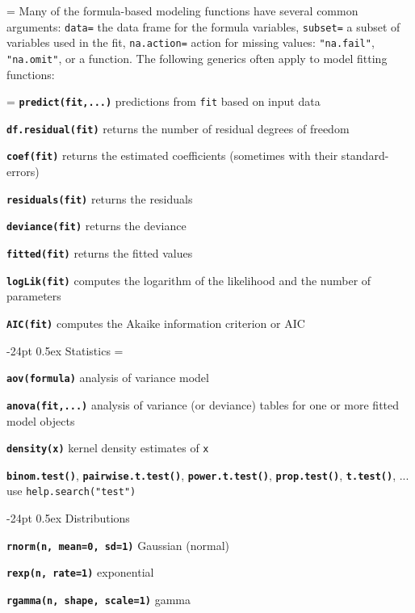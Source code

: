 \documentclass[8pt,landscape]{article}
\makeatletter
\renewcommand\section{\@startsection{section}{1}{0mm}%
                                     {-24pt}%
                                     {0.5ex}%
                                {\color{blue}\normalfont\large\bfseries}}
\newcommand{\code}{\texttt}
\newcommand{\bcode}[1]{\texttt{\textbf{#1}}}
\makeatother
\begin{document}
\begin{multicols*}{3}
\everypar={\hangindent=0mm}
Many of the formula-based modeling functions have several common
arguments: \code{data=} the data frame for the formula variables,
\code{subset=} a subset of variables used in the fit,
\code{na.action=} action for missing values: \code{"na.fail"}, \code{"na.omit"}, or
a function. The following generics often apply to model fitting functions: 

\everypar={\hangindent=9mm}
\bcode{predict(fit,...)}  predictions from \code{fit} based on input data

\bcode{df.residual(fit)}  returns the number of residual degrees of freedom

\bcode{coef(fit)}  returns the estimated coefficients (sometimes with their standard-errors)

\bcode{residuals(fit)}  returns the residuals

\bcode{deviance(fit)}  returns the deviance

\bcode{fitted(fit)}  returns the fitted values

\bcode{logLik(fit)}  computes the logarithm of the likelihood and the number of parameters

\bcode{AIC(fit)}  computes the Akaike information criterion or AIC


\section{Statistics}
\everypar={\hangindent=9mm}

\bcode{aov(formula)} analysis of variance model

\bcode{anova(fit,...)} analysis of variance (or deviance) tables for one or more
     fitted model objects

\bcode{density(x)} kernel density estimates of \code{x}

\bcode{binom.test()}, \bcode{pairwise.t.test()}, \bcode{power.t.test()},
\bcode{prop.test()}, \bcode{t.test()}, ... use
\code{help.search("test")} 





\section{Distributions}

\bcode{rnorm(n, mean=0, sd=1)} Gaussian (normal)  

\bcode{rexp(n, rate=1)} exponential

\bcode{rgamma(n, shape, scale=1)} gamma  


\end{multicols*}
\end{document}
